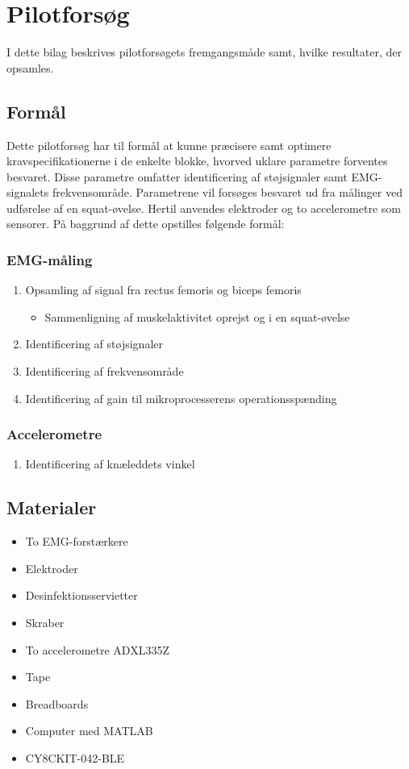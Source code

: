 \section{Pilotforsøg}
I dette bilag beskrives pilotforsøgets fremgangsmåde samt, hvilke resultater, der opsamles. 

\subsection{Formål}
Dette pilotforsøg har til formål at kunne præcisere samt optimere kravspecifikationerne i de enkelte blokke, hvorved uklare parametre forventes besvaret. Disse parametre omfatter identificering af støjsignaler samt EMG-signalets frekvensområde. Parametrene vil forsøges besvaret ud fra målinger ved udførelse af en squat-øvelse.
Hertil anvendes elektroder og to accelerometre som sensorer. På baggrund af dette opstilles følgende formål:  

\subsubsection{EMG-måling}
\begin{enumerate}
\item Opsamling af signal fra rectus femoris og biceps femoris
\begin{itemize}
\item Sammenligning af muskelaktivitet oprejst og i en squat-øvelse 
\end{itemize}
\item Identificering af støjsignaler
\item Identificering af frekvensområde
\item Identificering af gain til mikroprocesserens operationsspænding 
\end{enumerate}

\subsubsection{Accelerometre}
\begin{enumerate}
\item Identificering af knæleddets vinkel
\end{enumerate}

\subsection{Materialer} 
\begin{itemize}
\item To EMG-forstærkere
\item Elektroder 
\item Desinfektionsservietter
\item Skraber
\item To accelerometre ADXL335Z
\item Tape
\item Breadboards
\item Computer med MATLAB
\item CY8CKIT-042-BLE 
\end{itemize}

